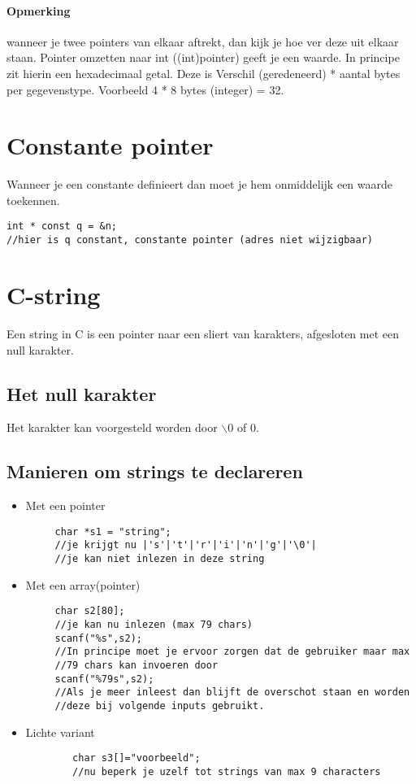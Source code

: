 \documentclass{article}
\begin{document}
\paragraph{Opmerking} wanneer je twee pointers van elkaar aftrekt, dan kijk je hoe ver deze uit elkaar staan.\newline
  Pointer omzetten naar int ((int)pointer) geeft je een waarde. In principe zit hierin een hexadecimaal getal. Deze is
  Verschil (geredeneerd) * aantal bytes per gegevenstype. Voorbeeld 4 * 8 bytes (integer) = 32.

\section{Constante pointer}
Wanneer je een constante definieert dan moet je hem onmiddelijk een waarde toekennen.
\newline
\begin{lstlisting}
int * const q = &n;  
//hier is q constant, constante pointer (adres niet wijzigbaar)
\end{lstlisting}
\section{C-string}
Een string in C is een pointer naar een sliert van karakters, afgesloten met een null karakter.
\subsection{Het null karakter}
 Het karakter kan voorgesteld worden door $\backslash{}0$ of $0$.
 \subsection{Manieren om strings te declareren}
 \begin{itemize}
   \item Met een pointer 
    \begin{lstlisting}
     char *s1 = "string";
     //je krijgt nu |'s'|'t'|'r'|'i'|'n'|'g'|'\0'|
     //je kan niet inlezen in deze string 
   \end{lstlisting} 
   \item Met een array(pointer)
    \begin{lstlisting}
     char s2[80];
     //je kan nu inlezen (max 79 chars)
     scanf("%s",s2);
     //In principe moet je ervoor zorgen dat de gebruiker maar max
     //79 chars kan invoeren door
     scanf("%79s",s2);
     //Als je meer inleest dan blijft de overschot staan en worden 
     //deze bij volgende inputs gebruikt.
    \end{lstlisting} 
   \item Lichte variant
    \begin{lstlisting}
        char s3[]="voorbeeld";
        //nu beperk je uzelf tot strings van max 9 characters
    \end{lstlisting}
 \end{itemize}
\end{document}
